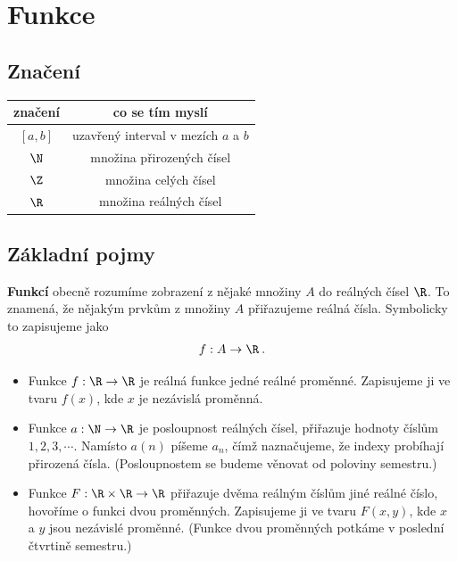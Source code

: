 \section*{Funkce}

\subsection*{Značení}

\begin{table}[H]
    \centering
    \begin{tabular}{c|c}
        značení & co se tím myslí \\
        \hline
        $[a,b]$ & uzavřený interval v mezích $a$ a $b$\\
        $\N$ & množina přirozených čísel \\
        $\Z$ & množina celých čísel \\
        $\R$ & množina reálných čísel
    \end{tabular}
\end{table}

\subsection*{Základní pojmy}

\textbf{Funkcí} obecně rozumíme zobrazení z nějaké množiny $A$ do reálných čísel $\R$. To znamená, že nějakým prvkům z množiny $A$ přiřazujeme reálná čísla. Symbolicky to zapisujeme jako \begin{align}
    f: A \to \R \:.
\end{align}

\begin{itemize}
    \item Funkce $f: \R \to \R$ je reálná funkce jedné reálné proměnné. Zapisujeme ji ve tvaru $f(x)$, kde $x$ je nezávislá proměnná.
    \item Funkce $a: \N \to \R$ je posloupnost reálných čísel, přiřazuje hodnoty číslům $1,2,3, \cdots$. Namísto $a(n)$ píšeme $a_n$, čímž naznačujeme, že indexy probíhají přirozená čísla. (Posloupnostem se budeme věnovat od poloviny semestru.)
    \item Funkce $F: \R \times \R \to \R$ přiřazuje dvěma reálným číslům jiné reálné číslo, hovoříme o funkci dvou proměnných. Zapisujeme ji ve tvaru $F(x,y)$, kde $x$ a $y$ jsou nezávislé proměnné. (Funkce dvou proměnných potkáme v poslední čtvrtině semestru.) 
\end{itemize}

